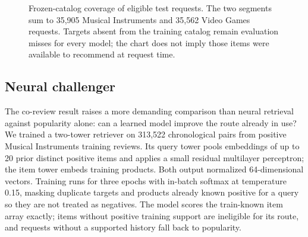 \documentclass[11pt]{article}
\begin{document}
\begin{figure}[ht]
\centering
{}
\caption{Frozen-catalog coverage of eligible test requests. The two segments sum to 35,905 Musical Instruments and 35,562 Video Games requests. Targets absent from the training catalog remain evaluation misses for every model; the chart does not imply those items were available to recommend at request time.}
\label{fig:catalog-coverage}
\end{figure}

\subsection{Neural challenger}
The co-review result raises a more demanding comparison than neural retrieval against popularity alone: can a learned model improve the route already in use? We trained a two-tower retriever on 313,522 chronological pairs from positive Musical Instruments training reviews. Its query tower pools embeddings of up to 20 prior distinct positive items and applies a small residual multilayer perceptron; the item tower embeds training products. Both output normalized 64-dimensional vectors. Training runs for three epochs with in-batch softmax at temperature 0.15, masking duplicate targets and products already known positive for a query so they are not treated as negatives. The model scores the train-known item array exactly; items without positive training support are ineligible for its route, and requests without a supported history fall back to popularity.
\end{document}
